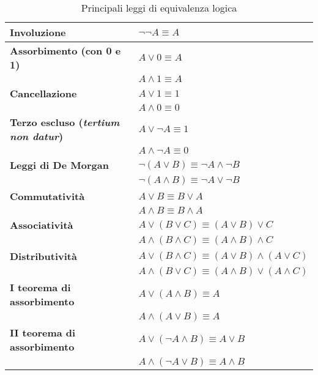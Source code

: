 \documentclass[a4paper,11pt]{report}
\begin{document}
\begin{table}[H]
    \centering
    \renewcommand{\arraystretch}{1.3}
    \begin{tabular}{|l|l|}
        \hline
        \textbf{Involuzione} & $\neg\neg A \equiv A$ \\
        \hline
        \textbf{Assorbimento (con 0 e 1)} &
        $A \lor 0 \equiv A$ \\
                                          & $A \land 1 \equiv A$ \\
                                          \hline
        \textbf{Cancellazione} &
        $A \lor 1 \equiv 1$ \\
                               & $A \land 0 \equiv 0$ \\
                               \hline
        \textbf{Terzo escluso (\textit{tertium non datur})} &
        $A \lor \neg A \equiv 1$ \\
                                                            & $A \land \neg A \equiv 0$ \\
                                                            \hline
        \textbf{Leggi di De Morgan} &
        $\neg(A \lor B) \equiv \neg A \land \neg B$ \\
                                    & $\neg(A \land B) \equiv \neg A \lor \neg B$ \\
                                    \hline
        \textbf{Commutatività} &
        $A \lor B \equiv B \lor A$ \\
                               & $A \land B \equiv B \land A$ \\
                               \hline
        \textbf{Associatività} &
        $A \lor (B \lor C) \equiv (A \lor B) \lor C$ \\
                               & $A \land (B \land C) \equiv (A \land B) \land C$ \\
                               \hline
        \textbf{Distributività} &
        $A \lor (B \land C) \equiv (A \lor B) \land (A \lor C)$ \\
                                & $A \land (B \lor C) \equiv (A \land B) \lor (A \land C)$ \\
                                \hline
        \textbf{I teorema di assorbimento} &
        $A \lor (A \land B) \equiv A$ \\
                                           & $A \land (A \lor B) \equiv A$ \\
                                           \hline
        \textbf{II teorema di assorbimento} &
        $A \lor (\neg A \land B) \equiv A \lor B$ \\
                                            & $A \land (\neg A \lor B) \equiv A \land B$ \\
                                            \hline

    \end{tabular}
    \caption{Principali leggi di equivalenza logica}
\end{table}
\end{document}
